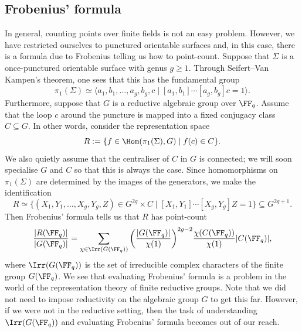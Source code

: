 \documentclass{amsart}
\theoremstyle{plain}
\theoremstyle{definition}
\theoremstyle{remark}
\begin{document}
\subsection*{Frobenius' formula}
In general, counting points over finite fields is not an easy problem. However, we have restricted ourselves to punctured orientable surfaces and, in this case, there is a formula due to Frobenius telling us how to point-count. Suppose that $\Sigma$ is a once-punctured orientable surface with genus $g\geq1$. Through Seifert--Van Kampen's theorem, one sees that this has the fundamental group
\[
\pi_1(\Sigma)\simeq \langle a_1,b_1,\ldots,a_g,b_g,c\mid [a_1,b_1]\cdots[a_g,b_g] c = 1\rangle.
\]
Furthermore, suppose that $G$ is a reductive algebraic group over $\FF_q$. Assume that the loop $c$ around the puncture is mapped into a fixed conjugacy class $C\subseteq G$. In other words, consider the representation space 
\[
R := \{f\in\Hom(\pi_1(\Sigma),G)\mid f(c)\in C\}.
\]
We also quietly assume that the centraliser of $C$ in $G$ is connected; we will soon specialise $G$ and $C$ so that this is always the case. Since homomorphisms on $\pi_1(\Sigma)$ are determined by the images of the generators, we make the identification
\[
R \simeq \{ (X_1,Y_1,\ldots,X_g,Y_g,Z) \in G^{2g}\times C \mid [X_1,Y_1]\cdots[X_g,Y_g] Z = 1\}\subseteq G^{2g+1}.
\]
Then Frobenius' formula \cite[Proposition 3.1.4]{HLRV11} tells us that $R$ has point-count
\[
\frac{|R(\FF_q)|}{|G(\FF_q)|} = \sum_{\chi\in\Irr(G(\FF_q))} \bigg(\frac{|G(\FF_q)|}{\chi(1)}\bigg)^{2g-2}\frac{\chi(C(\FF_q))}{\chi(1)}|C(\FF_q)|,
\]
where $\Irr(G(\FF_q))$ is the set of irreducible complex characters of the finite group $G(\FF_q)$. We see that evaluating Frobenius' formula is a problem in the world of the representation theory of finite reductive groups. Note that we did not need to impose reductivity on the algebraic group $G$ to get this far. However, if we were not in the reductive setting, then the task of understanding $\Irr(G(\FF_q))$ and evaluating Frobenius' formula becomes out of our reach.
\end{document}
